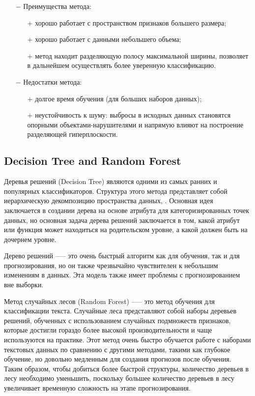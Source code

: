 \begin{itemize}
\item[$-$] Преимущества метода:
\begin{itemize}
	\item[$+$] хорошо работает с пространством признаков большего размера;
	\item[$+$] хорошо работает с данными небольшего объема;
	\item[$+$] метод находит разделяющую полосу максимальной ширины, позволяет в дальнейшем осуществлять более уверенную классификацию.
\end{itemize}
\item[$-$] Недостатки метода:
\begin{itemize}
	\item[$+$] долгое время обучения (для больших наборов данных);
	\item[$+$] неустойчивость к шуму: выбросы в исходных данных становятся опорными объектами-нарушителями и напрямую влияют на построение разделяющей гиперплоскости.
\end{itemize}
\end{itemize}
\subsection{Decision Tree and Random Forest}
Деревья решений (Decision Tree)\cite{45} являются одними из самых ранних и популярных классификаторов. Структура этого метода представляет собой иерархическую декомпозицию пространства данных\cite{7}, \cite{161}. Основная идея заключается в создании дерева на основе атрибута для категоризированных точек данных, но основная задача дерева решений заключается в том, какой атрибут или функция может находиться на родительском уровне, а какой должен быть на дочернем уровне.

Дерево решений —-- это очень быстрый алгоритм как для обучения, так и для прогнозирования, но он также чрезвычайно чувствителен к небольшим изменениям в данных\cite{166}. Эта модель также имеет проблемы с прогнозированием вне выборки\cite{168}.

Метод случайных лесов (Random Forest) --— это метод обучения для классификации текста. Случайные леса представляют собой наборы деревьев решений, обученных с использованием случайных подмножеств признаков, которые достигли гораздо более высокой производительности и чаще используются на практике. Этот метод очень быстро обучается работе с наборами текстовых данных по сравнению с другими методами, такими как глубокое обучение, но довольно медленным для создания прогнозов после обучения\cite{172}. Таким образом, чтобы добиться более быстрой структуры, количество деревьев в лесу необходимо уменьшить, поскольку большее количество деревьев в лесу увеличивает временную сложность на этапе прогнозирования.
